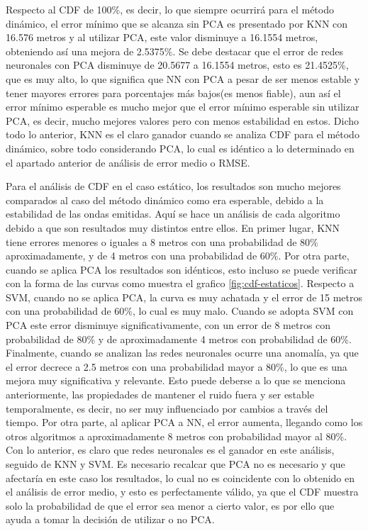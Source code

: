 Respecto al CDF de 100\%, es decir, lo que siempre ocurrirá para el método dinámico, el error mínimo que se alcanza sin PCA es presentado por KNN con 16.576 metros y al utilizar PCA, este valor disminuye a 16.1554 metros, obteniendo así una mejora de 2.5375\%.  Se debe destacar que el error de redes neuronales con PCA disminuye de 20.5677 a 16.1554 metros, esto es 21.4525\%, que es muy alto, lo que significa que NN con PCA a pesar de ser menos estable y tener mayores errores para porcentajes más bajos(es menos fiable), aun así el error mínimo esperable es mucho mejor que el error mínimo esperable sin utilizar PCA, es decir, mucho mejores valores pero con menos estabilidad en estos. Dicho todo lo anterior, KNN es el claro ganador cuando se analiza CDF para el método dinámico, sobre todo considerando PCA, lo cual es idéntico a lo determinado en el apartado anterior de análisis de error medio o RMSE.

Para el análisis de CDF en el caso estático, los resultados son mucho mejores comparados al caso del método dinámico como era esperable, debido a la estabilidad de las ondas emitidas. Aquí se hace un análisis de cada algoritmo debido a que son resultados muy distintos entre ellos. En primer lugar, KNN tiene errores menores o iguales a 8 metros con una probabilidad de 80\% aproximadamente, y de 4 metros con una probabilidad de 60\%. Por otra parte, cuando se aplica PCA los resultados son idénticos, esto incluso se puede verificar con la forma de las curvas como muestra el grafico \ref{fig:cdf-estaticos}. Respecto a SVM, cuando no se aplica PCA, la curva es muy achatada y el error de 15 metros con una probabilidad de 60\%, lo cual es muy malo. Cuando se adopta SVM con PCA este error disminuye significativamente, con un error de 8 metros con probabilidad de 80\% y de aproximadamente 4 metros con probabilidad de 60\%. Finalmente, cuando se analizan las redes neuronales ocurre una anomalía, ya que el error decrece a 2.5 metros con una probabilidad mayor a 80\%, lo que es una mejora muy significativa y relevante. Esto puede deberse a lo que se menciona anteriormente, las propiedades de mantener el ruido fuera y ser estable temporalmente, es decir, no ser muy influenciado por cambios a través del tiempo. Por otra parte, al aplicar PCA a NN, el error aumenta, llegando como los otros algoritmos a aproximadamente 8 metros con probabilidad mayor al 80\%. Con lo anterior, es claro que redes neuronales es el ganador en este análisis, seguido de KNN y SVM. Es necesario recalcar que PCA no es necesario y que afectaría en este caso los resultados, lo cual no es coincidente con lo obtenido en el análisis de error medio, y esto es perfectamente válido, ya que el CDF muestra solo la probabilidad de que el error sea menor a cierto valor, es por ello que ayuda a tomar la decisión de utilizar o no PCA. 

